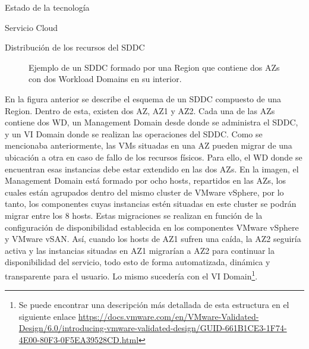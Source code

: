 \begin{chapter}{Estado de la tecnología}
\begin{section}{Servicio Cloud}
\begin{subsubsection}{Distribución de los recursos del SDDC}
\begin{figure}[h!]
          \caption{Ejemplo de un SDDC formado por una Region que contiene dos AZs con dos Workload Domains en su interior.}
          \label{fig:az-region-cluster}
        \end{figure}
        En la figura anterior se describe el esquema de un SDDC compuesto de una Region. Dentro de esta, existen dos AZ, AZ1 y AZ2. Cada una de las AZs contiene dos WD, un Management Domain desde donde se administra el SDDC, y un VI Domain donde se realizan las operaciones del SDDC. Como se mencionaba anteriormente, las VMs situadas en una AZ pueden migrar de una ubicación a otra en caso de fallo de los recursos físicos. Para ello, el WD donde se encuentran esas instancias debe estar extendido en las dos AZs. En la imagen, el Management Domain está formado por ocho hosts, repartidos en las AZs, los cuales están agrupados dentro del mismo cluster de VMware vSphere, por lo tanto, los componentes cuyas instancias estén situadas en este cluster se podrán migrar entre los 8 hosts. Estas migraciones se realizan en función de la configuración de disponibilidad establecida en los componentes VMware vSphere y VMware vSAN. Así, cuando los hosts de AZ1 sufren una caída, la AZ2 seguiría activa y las instancias situadas en AZ1 migrarían a AZ2 para continuar la disponibilidad del servicio, todo esto de forma automatizada, dinámica y transparente para el usuario. Lo mismo sucedería con el VI Domain\footnote{Se puede encontrar una descripción más detallada de esta estructura en el siguiente enlace \url{https://docs.vmware.com/en/VMware-Validated-Design/6.0/introducing-vmware-validated-design/GUID-661B1CE3-1F74-4E00-80F3-0F5EA39528CD.html}}.
        \end{subsubsection}
    

\end{section}
\end{chapter}
